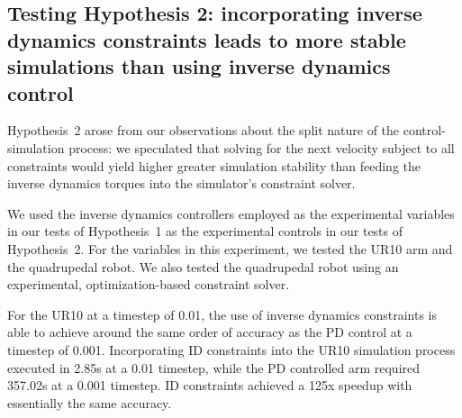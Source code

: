 \documentclass[conference]{IEEEtran}
\begin{document}
\subsection{Testing Hypothesis 2: incorporating inverse dynamics constraints leads to more stable simulations than using inverse dynamics control}
\label{section:hypo2}


Hypothesis~2 arose from our observations about the split nature of the control-simulation process: we speculated that solving for the next velocity subject to all constraints would yield higher greater simulation stability than feeding the inverse dynamics torques into the simulator's constraint solver. 

We used the inverse dynamics controllers employed as the experimental variables in our tests of Hypothesis~1 as the experimental controls in our tests of Hypothesis~2. For the variables in this experiment, we tested the UR10 arm and the quadrupedal robot. We also tested the quadrupedal robot using an experimental, optimization-based constraint solver. 

For the UR10 at a timestep of 0.01, the use of inverse dynamics constraints is able to achieve around the same order of accuracy as the PD control at a timestep of 0.001. Incorporating ID constraints into the UR10 simulation process executed in 2.85s at a 0.01 timestep, while the PD controlled arm required 357.02s at a 0.001 timestep. ID constraints achieved a 125x speedup with essentially the same accuracy.


\end{document}

